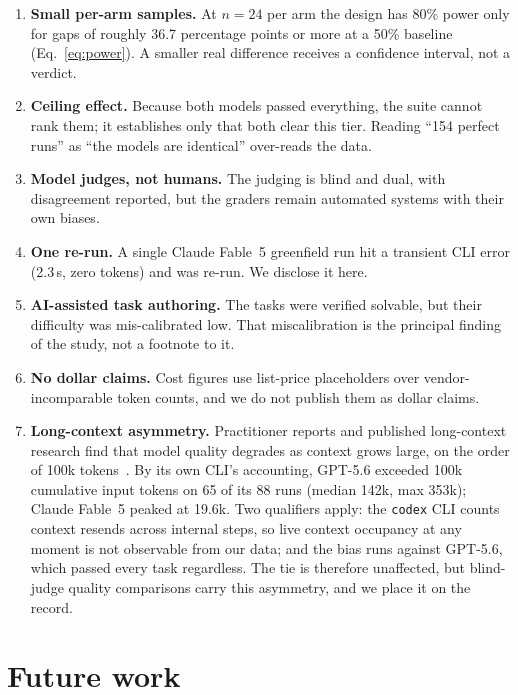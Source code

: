 \documentclass[11pt]{article}
\newcommand{\fable}{Claude Fable~5}
\newcommand{\sol}{GPT-5.6}
\begin{document}
\begin{enumerate}
  \item \textbf{Small per-arm samples.} At $n=24$ per arm the design has
        80\% power only for gaps of roughly 36.7 percentage points or more
        at a 50\% baseline (Eq.~\ref{eq:power}). A smaller real difference
        receives a confidence interval, not a verdict.
  \item \textbf{Ceiling effect.} Because both models passed everything, the
        suite cannot rank them; it establishes only that both clear this
        tier. Reading ``154 perfect runs'' as ``the models are identical''
        over-reads the data.
  \item \textbf{Model judges, not humans.} The judging is blind and dual,
        with disagreement reported, but the graders remain automated
        systems with their own biases.
  \item \textbf{One re-run.} A single \fable{} greenfield run hit a
        transient CLI error (2.3\,s, zero tokens) and was re-run. We
        disclose it here.
  \item \textbf{AI-assisted task authoring.} The tasks were verified
        solvable, but their difficulty was mis-calibrated low. That
        miscalibration is the principal finding of the study, not a
        footnote to it.
  \item \textbf{No dollar claims.} Cost figures use list-price placeholders
        over vendor-incomparable token counts, and we do not publish them
        as dollar claims.
  \item \textbf{Long-context asymmetry.} Practitioner reports and published
        long-context research find that model quality degrades as context
        grows large, on the order of 100k tokens~\cite{liu2024lost}. By its
        own CLI's accounting, \sol{} exceeded 100k cumulative input tokens
        on 65 of its 88 runs (median 142k, max 353k); \fable{} peaked at
        19.6k. Two qualifiers apply: the \texttt{codex} CLI counts context
        resends across internal steps, so live context occupancy at any
        moment is not observable from our data; and the bias runs against
        \sol{}, which passed every task regardless. The tie is therefore
        unaffected, but blind-judge quality comparisons carry this
        asymmetry, and we place it on the record.
\end{enumerate}

\section{Future work}
\end{document}
